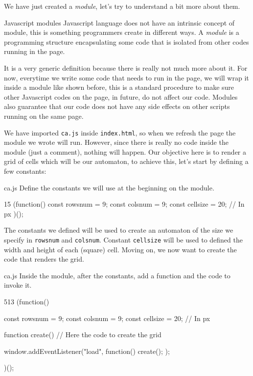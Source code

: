 We have just created a \textit{module}, let's try to understand a bit more about them.

\begin{tips}{Javascript modules}
Javascript language does not have an intrinsic concept of module, this is something programmers create in
different ways. A \textit{module} is a programming structure encapsulating some code that is isolated
from other codes running in the page.

It is a very generic definition because there is really not much more about it. For now, everytime
we write some code that needs to run in the page, we will wrap it inside a module like shown before,
this is a standard procedure to make sure other Javascript codes on the page, in future, do not
affect our code. Modules also guarantee that our code does not have any side
effects on other scripts running on the same page.
\end{tips}

We have imported \texttt{ca.js} inside \texttt{index.html}, so when we refresh the page the module
we wrote will run. However, since there is really no code inside the module (just a comment),
nothing will happen. Our objective here is to render a grid of cells which will be our automaton,
to achieve this, let's start by defining a few constants:

\begin{programcode}{ca.js}
Define the constants we will use at the beginning on the module.
\begin{codeh1}{1}{5}
(function(){
  const rowsnum = 9;
  const colsnum = 9;
  const cellsize = 20; // In px
})();
\end{codeh1}
\end{programcode}

The constants we defined will be used to create an automaton of the size we specify in 
\texttt{rowsnum} and \texttt{colsnum}. Constant \texttt{cellsize} will be used to defined the
width and height of each (square) cell. Moving on, we now want to create the code that renders the grid.

\begin{programcode}{ca.js}
Inside the module, after the constants, add a function and the code to invoke it.
\begin{codeh1}{5}{13}
(function(){
  const rowsnum = 9;
  const colsnum = 9;
  const cellsize = 20; // In px

  function create() {
    // Here the code to create the grid
  }

  window.addEventListener("load", function() {
    create();
  });
})();
\end{codeh1}
\end{programcode}

